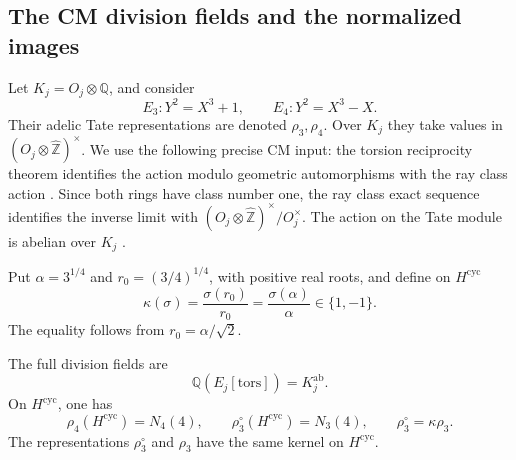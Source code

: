 \subsection{The CM division fields and the normalized images}

Let $K_j=O_j\otimes\mathbb Q$, and consider
\[
 E_3:Y^2=X^3+1,\qquad E_4:Y^2=X^3-X.
\]
Their adelic Tate representations are denoted $\rho_3,\rho_4$.
Over $K_j$ they take values in $(O_j\otimes\widehat{\mathbb Z})^
\times$.  We use the following precise CM input: the torsion
reciprocity theorem identifies the action modulo geometric
automorphisms with the ray class action
\cite[Theorem~12.27, printed p.~124]{MilneMF110}.
Since both rings have class number one, the ray class exact sequence
identifies the inverse limit with
$(O_j\otimes\widehat{\mathbb Z})^\times/O_j^\times$.
The action on the Tate module is abelian over $K_j$
\cite[Remark~12.12 and Proposition~12.13, printed p.~119]{MilneMF110}.

Put $\alpha=3^{1/4}$ and $r_0=(3/4)^{1/4}$, with positive real
roots, and define on $H^{\mathrm{cyc}}$
\[
 \kappa(\sigma)=\frac{\sigma(r_0)}{r_0}
               =\frac{\sigma(\alpha)}{\alpha}\in\{1,-1\}.
\]
The equality follows from $r_0=\alpha/\sqrt2$.

\begin{proposition}\label{prop:adelic-cm-images}
The full division fields are
\[
 \mathbb Q(E_j[\mathrm{tors}])=K_j^{\mathrm{ab}}.
\]
On $H^{\mathrm{cyc}}$, one has
\begin{equation}
 \rho_4(H^{\mathrm{cyc}})=N_4(4),\qquad
 \rho_3^{\circ}(H^{\mathrm{cyc}})=N_3(4),\qquad
 \rho_3^{\circ}=\kappa\rho_3.
 \label{eq:adelic-arithmetic-projections}
\end{equation}
The representations $\rho_3^{\circ}$ and $\rho_3$ have the same
kernel on $H^{\mathrm{cyc}}$.
\end{proposition}

